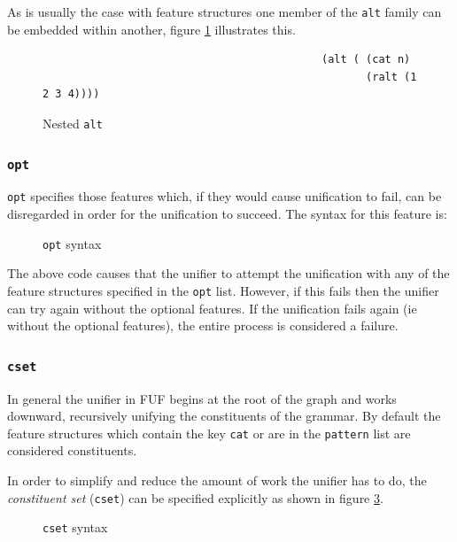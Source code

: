 \documentclass[12pt]{article}
\begin{document}
{As is usually the case with feature structures one member of the \texttt{alt} family 
can be embedded within another, figure \ref{alt-syntax} illustrates this.

\begin{figure}[h!]
{\scriptsize
\begin{verbatim}
                                            (alt ( (cat n)
                                                   (ralt (1 2 3 4))))
\end{verbatim}
}
\caption{Nested \texttt{alt}}
\label{alt-syntax}
\end{figure}

\subsubsection{\texttt{opt}}
\label{sec:opt}
\texttt{opt} specifies those features which, if they would cause unification to fail, 
can be disregarded in order for the unification to succeed.
The syntax for this feature is:

\begin{figure}[h!]
    \centering
{\scriptsize
{}
} 
\caption{\texttt{opt} syntax}
\label{opt-syntax}
\end{figure}

The above code causes that the unifier to attempt the unification with any of the feature
structures specified in the \texttt{opt} list.
However, if this fails then the unifier can try again without the optional
features. If the unification fails again (ie without the optional features), the entire process is considered a failure. 

\subsubsection{\texttt{cset}}
In general the unifier in FUF begins at the root of the graph and works downward, recursively unifying
the constituents of the grammar. By default the feature structures which contain
the key \texttt{cat} or are in the \texttt{pattern} list are considered constituents.

In order to simplify and reduce the amount of work the unifier
has to do, the \textit{constituent set} (\texttt{cset}) can be specified explicitly as shown
in figure \ref{cset-syntax}.
\begin{figure}[h!]
    \centering
{\scriptsize
{}
}
\caption{\texttt{cset} syntax}
\label{cset-syntax}
\end{figure}

}
\end{document}
